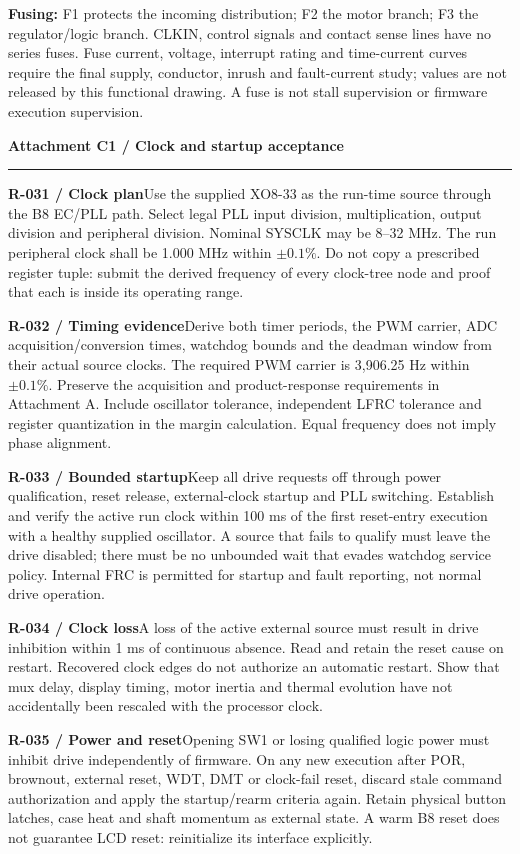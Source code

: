 \documentclass[10pt]{article}
\newcommand{\Clause}[2]{\par\noindent\textbf{#1}\quad #2\par}
\newcommand{\Attachment}[2]{{\Large\bfseries #1\par}\vspace{4pt}{\small\color{Muted}#2\par}\vspace{9pt}\hrule\vspace{9pt}}
\begin{document}
\textbf{Fusing:} F1 protects the incoming distribution; F2 the motor branch; F3 the regulator/logic branch. CLKIN, control signals and contact sense lines have no series fuses. Fuse current, voltage, interrupt rating and time-current curves require the final supply, conductor, inrush and fault-current study; values are not released by this functional drawing. A fuse is not stall supervision or firmware execution supervision.
\vfill{}
\clearpage
\Attachment{Attachment C1 / Clock and startup acceptance}{R-031 through R-035 / select a legal plan; demonstrate the timing.}
\Clause{R-031 / Clock plan}{Use the supplied XO8-33 as the run-time source through the B8 EC/PLL path. Select legal PLL input division, multiplication, output division and peripheral division. Nominal SYSCLK may be 8--32 MHz. The run peripheral clock shall be 1.000 MHz within $\pm0.1\%$. Do not copy a prescribed register tuple: submit the derived frequency of every clock-tree node and proof that each is inside its operating range.}
\Clause{R-032 / Timing evidence}{Derive both timer periods, the PWM carrier, ADC acquisition/conversion times, watchdog bounds and the deadman window from their actual source clocks. The required PWM carrier is 3,906.25 Hz within $\pm0.1\%$. Preserve the acquisition and product-response requirements in Attachment A. Include oscillator tolerance, independent LFRC tolerance and register quantization in the margin calculation. Equal frequency does not imply phase alignment.}
\Clause{R-033 / Bounded startup}{Keep all drive requests off through power qualification, reset release, external-clock startup and PLL switching. Establish and verify the active run clock within 100 ms of the first reset-entry execution with a healthy supplied oscillator. A source that fails to qualify must leave the drive disabled; there must be no unbounded wait that evades watchdog service policy. Internal FRC is permitted for startup and fault reporting, not normal drive operation.}
\Clause{R-034 / Clock loss}{A loss of the active external source must result in drive inhibition within 1 ms of continuous absence. Read and retain the reset cause on restart. Recovered clock edges do not authorize an automatic restart. Show that mux delay, display timing, motor inertia and thermal evolution have not accidentally been rescaled with the processor clock.}
\Clause{R-035 / Power and reset}{Opening SW1 or losing qualified logic power must inhibit drive independently of firmware. On any new execution after POR, brownout, external reset, WDT, DMT or clock-fail reset, discard stale command authorization and apply the startup/rearm criteria again. Retain physical button latches, case heat and shaft momentum as external state. A warm B8 reset does not guarantee LCD reset: reinitialize its interface explicitly.}
\end{document}
